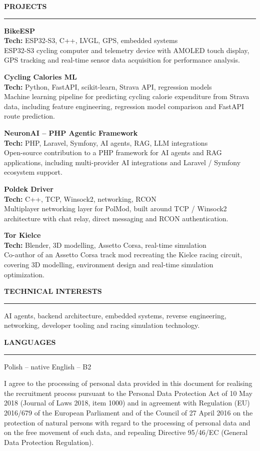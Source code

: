 \documentclass[10pt,a4paper]{article}
\newcommand{\sectiontitle}[1]{%
  \vspace{10pt}%
  {\large\bfseries\MakeUppercase{#1}}\\[-2pt]%
  {\color{cvolive}\hrule}%
  \vspace{4pt}%
}
\begin{document}
\sectiontitle{Projects}
\textbf{BikeESP}\\
{\small\textbf{Tech:} ESP32-S3, C++, LVGL, GPS, embedded systems}\\
ESP32-S3 cycling computer and telemetry device with AMOLED touch display, GPS tracking
and real-time sensor data acquisition for performance analysis.

\vspace{4pt}
\textbf{Cycling Calories ML}\\
{\small\textbf{Tech:} Python, FastAPI, scikit-learn, Strava API, regression models}\\
Machine learning pipeline for predicting cycling calorie expenditure from Strava data,
including feature engineering, regression model comparison and FastAPI route prediction.

\vspace{4pt}
\textbf{NeuronAI -- PHP Agentic Framework}\\
{\small\textbf{Tech:} PHP, Laravel, Symfony, AI agents, RAG, LLM integrations}\\
Open-source contribution to a PHP framework for AI agents and RAG applications,
including multi-provider AI integrations and Laravel / Symfony ecosystem support.

\vspace{4pt}
\textbf{Poldek Driver}\\
{\small\textbf{Tech:} C++, TCP, Winsock2, networking, RCON}\\
Multiplayer networking layer for PolMod, built around TCP / Winsock2 architecture with
chat relay, direct messaging and RCON authentication.

\vspace{4pt}
\textbf{Tor Kielce}\\
{\small\textbf{Tech:} Blender, 3D modelling, Assetto Corsa, real-time simulation}\\
Co-author of an Assetto Corsa track mod recreating the Kielce racing circuit, covering
3D modelling, environment design and real-time simulation optimization.

\sectiontitle{Technical Interests}
AI agents, backend architecture, embedded systems, reverse engineering, networking,
developer tooling and racing simulation technology.

\sectiontitle{Languages}
Polish -- native \quad English -- B2

\vfill
{\scriptsize
I agree to the processing of personal data provided in this document for realising the recruitment process pursuant to the Personal Data Protection Act of 10 May 2018 (Journal of Laws 2018, item 1000) and in agreement with Regulation (EU) 2016/679 of the European Parliament and of the Council of 27 April 2016 on the protection of natural persons with regard to the processing of personal data and on the free movement of such data, and repealing Directive 95/46/EC (General Data Protection Regulation).
}
\end{document}
